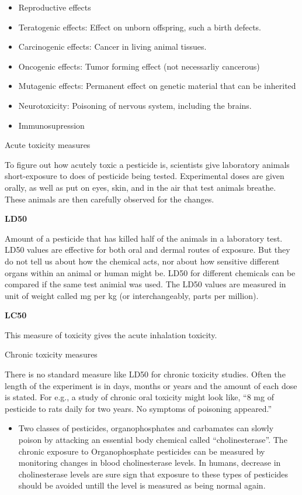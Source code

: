 \documentclass[
  openany]{book}
\providecommand{\tightlist}{%
  \setlength{\itemsep}{0pt}\setlength{\parskip}{0pt}}
\begin{document}
\begin{itemize}
  \begin{itemize}
  \tightlist
  \item
    Reproductive effects
  \item
    Teratogenic effects: Effect on unborn offspring, such a birth defects.
  \item
    Carcinogenic effects: Cancer in living animal tissues.
  \item
    Oncogenic effects: Tumor forming effect (not necessarliy cancerous)
  \item
    Mutagenic effects: Permanent effect on genetic material that can be inherited
  \item
    Neurotoxicity: Poisoning of nervous system, including the brains.
  \item
    Immunosupression
  \end{itemize}
\end{itemize}

Acute toxicity measures

To figure out how acutely toxic a pesticide is, scientists give laboratory animals short-exposure to does of pesticide being tested. Experimental doses are given orally, as well as put on eyes, skin, and in the air that test animals breathe. These animals are then carefully observed for the changes.

\textbf{LD50}

Amount of a pesticide that has killed half of the animals in a laboratory test. LD50 values are effective for both oral and dermal routes of exposure. But they do not tell us about how the chemical acts, nor about how sensitive different organs within an animal or human might be. LD50 for different chemicals can be compared if the same test animial was used. The LD50 values are measured in unit of weight called mg per kg (or interchangeably, parts per million).

\textbf{LC50}

This measure of toxicity gives the acute inhalation toxicity.

Chronic toxicity measures

There is no standard measure like LD50 for chronic toxicity studies. Often the length of the experiment is in days, months or years and the amount of each dose is stated. For e.g., a study of chronic oral toxicity might look like, ``8 mg of pesticide to rats daily for two years. No symptoms of poisoning appeared.''

\begin{itemize}
\tightlist
\item
  Two classes of pesticides, organophosphates and carbamates can slowly poison by attacking an essential body chemical called ``cholinesterase''. The chronic exposure to Organophosphate pesticides can be measured by monitoring changes in blood cholinesterase levels. In humans, decrease in cholinesterase levels are sure sign that exposure to these types of pesticides should be avoided untill the level is measured as being normal again.
\end{itemize}
\end{document}
